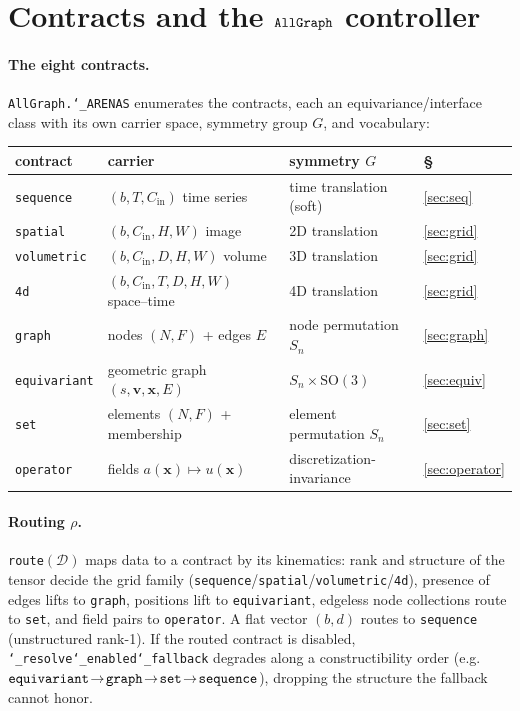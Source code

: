 \documentclass[11pt]{article}
\newcommand{\allowbreakhere}{\discretionary{}{}{}}
\newcommand{\code}[1]{\texttt{\def\_{\char`_\allowbreakhere}#1}}
\newcommand{\Dcal}{\mathcal{D}}
\newcommand{\SO}{\mathrm{SO}(3)}
\newcommand{\Sn}{S_n}
\newcommand{\Cin}{C_{\mathrm{in}}}
\begin{document}
\section{Contracts and the \texorpdfstring{$\code{AllGraph}$}{AllGraph} controller}
\label{sec:contracts}

\paragraph{The eight contracts.} \code{AllGraph.\_ARENAS} enumerates the contracts, each an equivariance/interface
class with its own carrier space, symmetry group $G$, and vocabulary:
\begin{center}
\small
\begin{tabular}{@{}llll@{}}
\toprule
contract & carrier & symmetry $G$ & \S \\
\midrule
\code{sequence}    & $(b,T,\Cin)$ time series           & time translation (soft)     & \ref{sec:seq}\\
\code{spatial}     & $(b,\Cin,H,W)$ image               & 2D translation              & \ref{sec:grid}\\
\code{volumetric}  & $(b,\Cin,D,H,W)$ volume            & 3D translation              & \ref{sec:grid}\\
\code{4d}          & $(b,\Cin,T,D,H,W)$ space--time     & 4D translation              & \ref{sec:grid}\\
\code{graph}       & nodes $(N,F)$ + edges $E$          & node permutation $\Sn$      & \ref{sec:graph}\\
\code{equivariant} & geometric graph $(s,\bm v,\bm x,E)$& $\Sn\times\SO$              & \ref{sec:equiv}\\
\code{set}         & elements $(N,F)$ + membership      & element permutation $\Sn$   & \ref{sec:set}\\
\code{operator}    & fields $a(\bm x)\!\mapsto\!u(\bm x)$& discretization-invariance  & \ref{sec:operator}\\
\bottomrule
\end{tabular}
\end{center}

\paragraph{Routing $\rho$.} \code{route}$(\Dcal)$ maps data to a contract by its kinematics: rank and
structure of the tensor decide the grid family (\code{sequence}/\code{spatial}/\code{volumetric}/\code{4d}),
presence of edges lifts to \code{graph}, positions lift to \code{equivariant}, edgeless node collections
route to \code{set}, and field pairs to \code{operator}. A flat vector $(b,d)$ routes to \code{sequence}
(unstructured rank-1). If the routed contract is disabled, \code{\_resolve\_enabled\_fallback} degrades along a
constructibility order (e.g. $\code{equivariant}\!\to\!\code{graph}\!\to\!\code{set}\!\to\!\code{sequence}$),
dropping the structure the fallback cannot honor.
\end{document}

